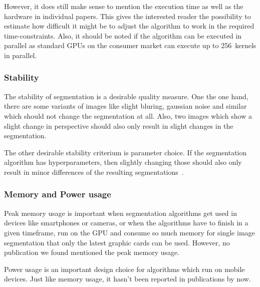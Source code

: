 However, it does still make sense to mention the execution time as well as the
hardware in individual papers. This gives the interested reader the possibility
to estimate how difficult it might be to adjust the algorithm to work in the
required time-constraints. Also, it should be noted if the algorithm can be
executed in parallel as standard \glspl{GPU} on the consumer market can execute
up to 256~kernels in parallel.




\subsubsection{Stability}%
\label{subsubsec:stability-quality-measure}%
The stability of segmentation is a desirable quality measure. One the one hand,
there are some variants of images like slight bluring, gaussian noise and
similar which should not change the segmentation at all. Also, two images which
show a slight change in perspective should also only result in slight changes
in the segmentation.\cite{pantofaru2005comparison}

The other desirable stability criterium is parameter choice. If the
segmentation algorithm has hyperparameters, then slightly changing those should
also only result in minor differences of the resulting segmentations~\cite{pantofaru2005comparison}.


\subsubsection{Memory and Power usage}
Peak memory usage is important when segmentation algorithms get used in devices
like smartphones or cameras, or when the algorithms have to finish in a given
timeframe, run on the \gls{GPU} and consume so much memory for single image
segmentation that only the latest graphic cards can be used. However, no
publication we found mentioned the peak memory usage.

Power usage is an important design choice for algorithms which run on mobile
devices. Just like memory usage, it hasn't been reported in publications by
now.
